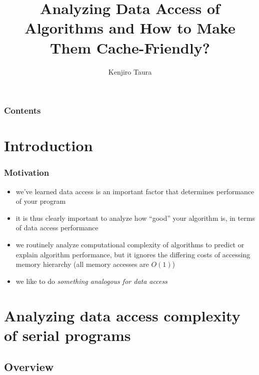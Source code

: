 \documentclass[12pt,dvipdfmx]{beamer}
\title{Analyzing Data Access of Algorithms 
  and How to Make Them Cache-Friendly?}
\institute{}
\author{Kenjiro Taura}
\date{}
\newcommand{\ao}[1]{{\color{blue}#1}}
\begin{document}
\maketitle

\begin{frame}
\frametitle{Contents}
\tableofcontents
\end{frame}

\section{Introduction}

\begin{frame}
\frametitle{Motivation}
\begin{itemize}
\item<1-> we've learned data access is an important factor 
  that determines performance of your program

\item<2-> it is thus clearly important to analyze how ``good''
  your algorithm is, in terms of data access
  performance

\item<3-> we routinely analyze computational
  complexity of algorithms to predict or explain
  algorithm performance, but it ignores the differing
  costs of accessing memory hierarchy (all memory accesses
  are $O(1)$)

\item<4-> we like to do 
  \ao{\em something analogous for data access}
\end{itemize}
\end{frame}

\section{Analyzing data access complexity of serial programs}

\subsection{Overview}
\end{document}

